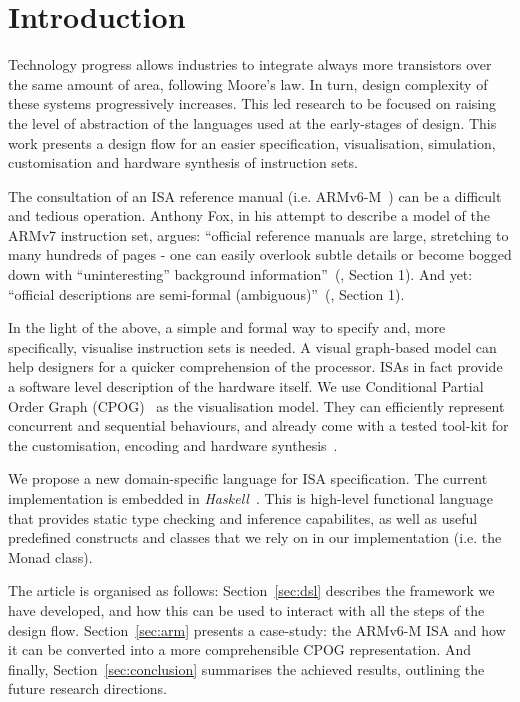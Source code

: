 \documentclass[conference]{IEEEtran}
\begin{document}
\IEEEpeerreviewmaketitle

\section{Introduction}
\label{sec:intro}
Technology progress allows industries to integrate always more transistors over the
same amount of area, following Moore's law. In turn, design complexity of these
systems progressively increases. This led research to be focused on raising the
level of abstraction of the languages used at the early-stages of design. This work
presents a design flow for an easier specification, visualisation, simulation,
customisation and hardware synthesis of instruction sets.

The consultation of an ISA reference manual (i.e. ARMv6-M~\cite{armManual}) can be
a difficult and tedious operation. Anthony Fox, in his attempt to describe a model
of the ARMv7 instruction set, argues: ``official reference manuals are large,
stretching to many hundreds of pages - one can easily overlook subtle details or
become bogged down with ``uninteresting'' background information''~(\cite{armv7},
Section 1). And yet: ``official descriptions are semi-formal (ambiguous)''~(\cite{armv7}, Section 1). 

In the light of the above, a simple and formal way to specify and, more
specifically, visualise instruction sets is needed. A visual graph-based model can
help designers for a quicker comprehension of the processor. ISAs in fact provide a
software level description of the hardware itself. We use Conditional Partial Order
Graph (CPOG)~\cite{cpog}\cite{andreyPhd} as the visualisation model. They can
efficiently represent concurrent and sequential behaviours, and already come with a
tested tool-kit for the customisation, encoding and hardware synthesis~\cite{workcraft}\cite{satEncoding}\cite{acsd}.

We propose a new domain-specific language for ISA specification. The current
implementation is embedded in \textit{Haskell}~\cite{haskell}. This is high-level
functional language that provides static type checking and inference capabilites,
as well as useful predefined constructs and classes that we rely on in our
implementation (i.e. the Monad class).

The article is organised as follows: Section~\ref{sec:dsl} describes the framework
we have developed, and how this can be used to interact with all the steps of the 
design flow. Section~\ref{sec:arm} presents a case-study: the ARMv6-M ISA and how it
can be converted into a more comprehensible CPOG representation. 
And finally, Section~\ref{sec:conclusion} summarises the achieved results, 
outlining the future research directions.
\end{document}
